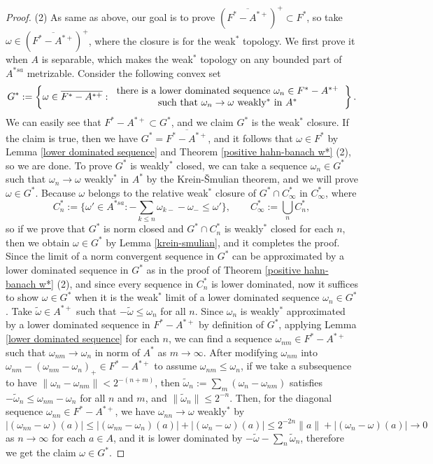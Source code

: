 \documentclass[a4paper]{amsart}
\theoremstyle{plain}
\theoremstyle{definition}
\begin{document}
\begin{proof}
(2)
As same as above, our goal is to prove $(\overline{F^*-A^{*+}})^+\subset F^*$, so take $\omega\in(\overline{F^*-A^{*+}})^+$, where the closure is for the weak$^*$ topology.
We first prove it when $A$ is separable, which makes the weak$^*$ topology on any bounded part of $A^{*sa}$ metrizable.
Consider the following convex set
\[G^*:=\left\{\omega\in\overline{F^*-A^{*+}}:\begin{tabular}{c}there is a lower dominated sequence $\omega_n\in F^*-A^{*+}$\\such that $\omega_n\to\omega$ weakly$^*$ in $A^*$\end{tabular}\right\}.\]
We can easily see that $F^*-A^{*+}\subset G^*$, and we claim $G^*$ is the weak$^*$ closure.
If the claim is true, then we have $G^*=\overline{F^*-A^{*+}}$, and it follows that $\omega\in F^*$ by Lemma \ref{lower dominated sequence} and Theorem \ref{positive hahn-banach w*} (2), so we are done.
To prove $G^*$ is weakly$^*$ closed, we can take a sequence $\omega_n\in G^*$ such that $\omega_n\to\omega$ weakly$^*$ in $A^*$ by the Krein-\v Smulian theorem, and we will prove $\omega\in G^*$.
Because $\omega$ belongs to the relative weak$^*$ closure of $G^*\cap C_\infty^*$ in $C_\infty^*$, where
\[C_n^*:=\{\omega'\in A^{*sa}:-\sum_{k\le n}\omega_{k-}-\omega_-\le\omega'\},\qquad C_\infty^*:=\bigcup_nC_n^*,\]
so if we prove that $G^*$ is norm closed and $G^*\cap C_n^*$ is weakly$^*$ closed for each $n$, then we obtain $\omega\in G^*$ by Lemma \ref{krein-smulian}, and it completes the proof.
Since the limit of a norm convergent sequence in $G^*$ can be approximated by a lower dominated sequence in $G^*$ as in the proof of Theorem \ref{positive hahn-banach w*} (2), and since every sequence in $C_n^*$ is lower dominated, now it suffices to show $\omega\in G^*$ when it is the weak$^*$ limit of a lower dominated sequence $\omega_n\in G^*$.
Take $\widetilde\omega\in A^{*+}$ such that $-\widetilde\omega\le\omega_n$ for all $n$.
Since $\omega_n$ is weakly$^*$ approximated by a lower dominated sequence in $F^*-A^{*+}$ by definition of $G^*$, applying Lemma \ref{lower dominated sequence} for each $n$, we can find a sequence $\omega_{nm}\in F^*-A^{*+}$ such that $\omega_{nm}\to\omega_n$ in norm of $A^*$ as $m\to\infty$.
After modifying $\omega_{nm}$ into $\omega_{nm}-(\omega_{nm}-\omega_n)_+\in F^*-A^{*+}$ to assume $\omega_{nm}\le\omega_n$, if we take a subsequence to have $\|\omega_n-\omega_{nm}\|<2^{-(n+m)}$, then $\widetilde\omega_n:=\sum_m(\omega_n-\omega_{nm})$ satisfies $-\widetilde\omega_n\le\omega_{nm}-\omega_n$ for all $n$ and $m$, and $\|\widetilde\omega_n\|\le2^{-n}$.
Then, for the diagonal sequence $\omega_{nn}\in F^*-A^{*+}$, we have $\omega_{nn}\to\omega$ weakly$^*$ by
\[|(\omega_{nn}-\omega)(a)|\le|(\omega_{nn}-\omega_n)(a)|+|(\omega_n-\omega)(a)|\le2^{-2n}\|a\|+|(\omega_n-\omega)(a)|\to0\]
as $n\to\infty$ for each $a\in A$, and it is lower dominated by $-\widetilde\omega-\sum_n\widetilde\omega_n$, therefore we get the claim $\omega\in G^*$.




\end{proof}
\end{document}
